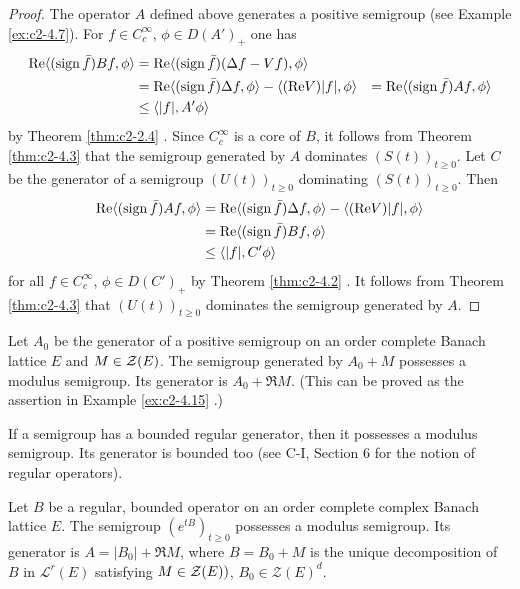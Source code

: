 \begin{proof}
The operator $A$ defined above generates a positive semigroup (see Example \ref{ex:c2-4.7}).
For $f \in C^{\infty}_{c}$, $\phi \in D(A')_{+}$ one has
\begin{align*}
\mathop{}\!\mathrm{Re}\langle(\operatorname{sign}  \bar{f})Bf,\phi\rangle &= \mathop{}\!\mathrm{Re}\langle(\operatorname{sign}  \bar{f})(\Delta f - Vf),\phi\rangle \\
&=\mathop{}\!\mathrm{Re}\langle(\operatorname{sign}  \bar{f})\Delta f,\phi\rangle - \langle(\mathop{}\!\mathrm{Re} V)|f|,\phi\rangle &= \mathop{}\!\mathrm{Re}\langle(\operatorname{sign}  \bar{f})Af,\phi\rangle \\
&\leq \langle|f|,A'\phi\rangle 
\end{align*}
by Theorem \ref{thm:c2-2.4}  .
Since $C^{\infty}_{c}$ is a core of $B$, it follows from Theorem \ref{thm:c2-4.3}   that the semigroup generated by $A$ dominates $(S(t))_{t \geq 0}$.
Let $C$ be the generator of a semigroup $(U(t))_{t \geq 0}$ dominating $(S(t))_{t \geq 0}$.
Then
\begin{align*}
\mathop{}\!\mathrm{Re}\langle(\operatorname{sign}  \bar{f})Af,\phi\rangle &= \mathop{}\!\mathrm{Re}\langle(\operatorname{sign}  \bar{f})\Delta f,\phi\rangle - \langle(\mathop{}\!\mathrm{Re} V)|f|,\phi\rangle \\
&= \mathop{}\!\mathrm{Re}\langle(\operatorname{sign}  \bar{f})Bf,\phi\rangle\\
&\leq \langle|f|,C'\phi\rangle 
\end{align*}
for all  $f \in C^{\infty}_{c}$, $\phi \in D(C')_{+}$  by Theorem \ref{thm:c2-4.2}  . 
It follows from Theorem \ref{thm:c2-4.3}   that $(U(t))_{t \geq 0}$ dominates the semigroup generated by $A$.
\end{proof}
\begin{example}\label{ex:c2-4.16}
Let $A_{0}$ be the generator of a positive semigroup on an order complete Banach lattice $E$ and $M \in \mathcal{Z}(E)$.
The semigroup generated by $A_{0} + M$ possesses a modulus semigroup. Its generator is $A_{0} + \Re M$. (This can be proved as the assertion in Example \ref{ex:c2-4.15}  .)
\end{example}

If a semigroup has a bounded regular generator, then it possesses a modulus semigroup. Its generator is bounded too (see C-I, Section 6 for the notion of regular operators).

\begin{theorem}\label{thm:c2-4.17}
Let $B$ be a regular, bounded operator on an order complete complex Banach lattice $E$. The semigroup $(e^{tB})_{t \geq 0}$ possesses a modulus semigroup. Its generator is $A = |B_{0}| + \Re M$, where $B = B_{0} + M$ is the unique decomposition of $B$ in $\mathcal{L}^{r}(E)$ satisfying $M \in \mathcal{Z}(E))$, $B_{0} \in \mathcal{Z}(E)^{d}$.
\end{theorem}

